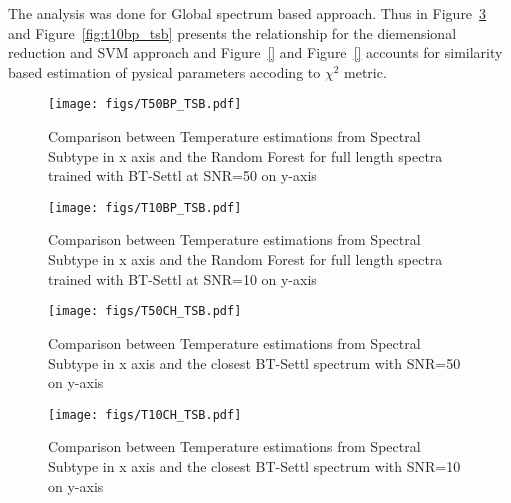 {The analysis was done for Global spectrum based approach. 
Thus in Figure~\ref{fig:t50bp_tsb} and Figure~\ref{fig:t10bp_tsb} presents the relationship for 
the diemensional reduction and SVM approach and 
Figure~\ref{} and Figure~\ref{} accounts for similarity 
based estimation of pysical parameters accoding to $\chi^2$ metric.

\begin {figure}
 \begin{center}
 \texttt{[image: figs/T50BP\_TSB.pdf]}
 \caption{Comparison between Temperature estimations from Spectral Subtype 
 in x axis and the Random Forest for full length spectra trained with BT-Settl 
 at SNR=50 on y-axis}
 \label{fig:t50bp_tsb}
 \end{center}
\end {figure}

\begin {figure}
 \begin{center}
 \texttt{[image: figs/T10BP\_TSB.pdf]}
 \caption{Comparison between Temperature estimations from Spectral Subtype 
 in x axis and the Random Forest for full length spectra trained with BT-Settl 
 at SNR=10 on y-axis}
 \label{fig:t10BP_tsb}
 \end{center}
\end {figure}

\begin {figure}
 \begin{center}
 \texttt{[image: figs/T50CH\_TSB.pdf]}
 \caption{Comparison between Temperature estimations from Spectral Subtype 
 in x axis and the closest BT-Settl spectrum with SNR=50 on y-axis}
 \label{fig:t50bp_tsb}
 \end{center}
\end {figure}

\begin {figure}
 \begin{center}
 \texttt{[image: figs/T10CH\_TSB.pdf]}
 \caption{Comparison between Temperature estimations from Spectral Subtype 
 in x axis and the closest BT-Settl spectrum with SNR=10 on y-axis}
 \label{fig:t10BP_tsb}
 \end{center}
\end {figure}

%
}


